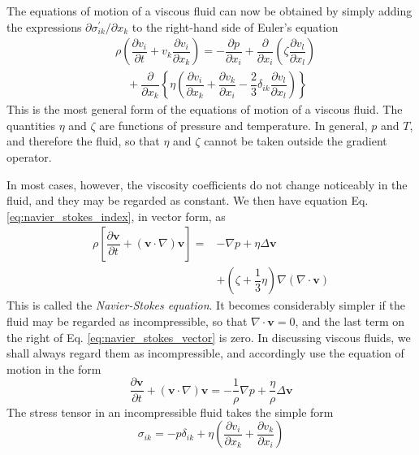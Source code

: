 \documentclass[conference]{IEEEtran}
\theoremstyle{definition}
\theoremstyle{remark}
\begin{document}
    The equations of motion of a viscous fluid can now be obtained by simply adding the expressions $\partial \sigma^\prime_{ik} / \partial x_k$ to the right-hand side of Euler's equation
    \begin{align}
        & \rho \left( \dfrac{\partial v_i}{\partial t} + v_k \dfrac{\partial v_i}{\partial x_k} \right) = -\dfrac{\partial p}{\partial x_i} + \dfrac{\partial}{\partial x_i} \left( \zeta \dfrac{\partial v_l}{\partial x_l} \right) \nonumber \\ 
        & \quad + \dfrac{\partial}{\partial x_k} \left\{ \eta \left( \dfrac{\partial v_i}{\partial x_k} + \dfrac{\partial v_k}{\partial x_i} -\dfrac23 \delta_{ik} \dfrac{\partial v_l}{\partial x_l} \right) \right\}
        \label{eq:navier_stokes_index}
    \end{align}
    This is the most general form of the equations of motion of a viscous fluid. The quantities $\eta$ and $\zeta$ are functions of pressure and temperature. In general, $p$ and $T$, and therefore the fluid, so that $\eta$ and $\zeta$ cannot be taken outside the gradient operator.

    In most cases, however, the viscosity coefficients do not change noticeably in the fluid, and they may be regarded as constant. We then have equation Eq. \ref{eq:navier_stokes_index}, in vector form, as
    \begin{align}
        \rho \left[ \dfrac{\partial \mathbf{v}}{\partial t} + (\mathbf{v} \cdot \nabla) \mathbf{v} \right] =& -\nabla p + \eta \Delta \mathbf{v} \nonumber \\
        & + (\zeta + \dfrac13 \eta) \nabla (\nabla \cdot \mathbf{v})
        \label{eq:navier_stokes_vector}
    \end{align}
    This is called the \emph{Navier-Stokes equation}. It becomes considerably simpler if the fluid may be regarded as incompressible, so that $\nabla \cdot \mathbf{v} = 0$, and the last term on the right of Eq. \ref{eq:navier_stokes_vector} is zero. In discussing viscous fluids, we shall always regard them as incompressible, and accordingly use the equation of motion in the form
    \begin{equation}
        \dfrac{\partial \mathbf{v}}{\partial t} + (\mathbf{v} \cdot \nabla) \mathbf{v} = -\dfrac1\rho \nabla p + \dfrac{\eta}{\rho} \Delta \mathbf{v}
        \label{eq:ns_impressible}
    \end{equation}
    The stress tensor in an incompressible fluid takes the simple form
    \begin{equation}
        \sigma_{ik} = - p \delta_{ik} + \eta \left( \dfrac{\partial v_i}{\partial x_k} + \dfrac{\partial v_k}{\partial x_i} \right)
    \end{equation}
\end{document}

